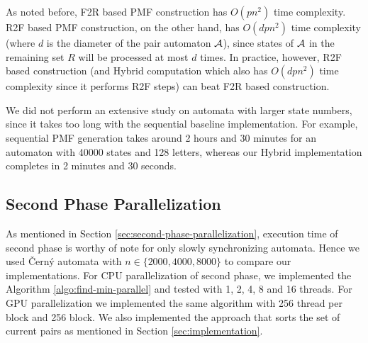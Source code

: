 \documentclass[12pt]{article}
\begin{document}
As noted before, F2R based PMF construction has $O(pn^2)$ time complexity. R2F based PMF construction, on the other hand, has $O(dpn^2)$ time complexity (where $d$ is the diameter of the pair automaton ${\cal A}$), since states of ${\cal A}$ in the remaining set $R$ will be processed at most $d$ times. In practice, however, R2F based construction (and Hybrid computation which also has $O(dpn^2)$ time complexity since it performs R2F steps) can beat F2R based construction.

We did not perform an extensive study on automata with larger state numbers, since it takes too long with the sequential baseline implementation. For example, sequential PMF generation takes around 2 hours and 30 minutes for an automaton with 40000 states and 128 letters, whereas our Hybrid implementation completes in 2 minutes and 30 seconds.

\subsection{Second Phase Parallelization}

As mentioned in Section \ref{sec:second-phase-parallelization}, execution time of second phase is worthy of note for only slowly synchronizing automata. Hence we used \v{C}ern\'y automata with $n \in \{ 2000, 4000, 8000 \}$ to compare our implementations. For CPU parallelization of second phase, we implemented the Algorithm \ref{algo:find-min-parallel} and tested with 1, 2, 4, 8 and 16 threads. For GPU parallelization we implemented the same algorithm with 256 thread per block and 256 block. We also implemented the approach that sorts the set of current pairs as mentioned in Section \ref{sec:implementation}.
\end{document}
